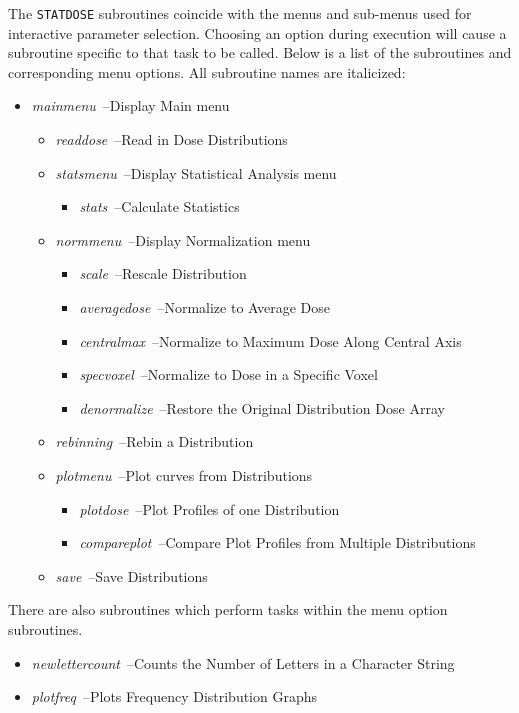 \documentclass[12pt,twoside]{article}
\begin{document}
The \verb+STATDOSE+ subroutines coincide with the menus and sub-menus used for interactive parameter selection. Choosing an option during execution will cause a subroutine specific to that task to be called. Below is a list of the subroutines and corresponding menu options.
All subroutine names are italicized:
\begin{itemize}
\item {\em mainmenu}\ --Display Main menu
\begin{itemize}
\item {\em readdose}\ --Read in Dose Distributions
\item {\em statsmenu}\ --Display Statistical Analysis menu
\begin{itemize}
\item {\em stats}\ --Calculate Statistics
\end{itemize}
\item {\em normmenu}\ --Display Normalization menu
\begin{itemize}
\item {\em scale}\ --Rescale Distribution
\item {\em averagedose}\ --Normalize to Average Dose
\item {\em centralmax}\ --Normalize to Maximum Dose Along Central Axis
\item {\em specvoxel}\ --Normalize to Dose in a Specific Voxel
\item {\em denormalize}\ --Restore the Original Distribution Dose Array
\end{itemize}
\item {\em rebinning}\ --Rebin a Distribution
\item {\em plotmenu}\ --Plot curves from Distributions
\begin{itemize}
\item {\em plotdose}\ --Plot Profiles of one Distribution
\item {\em compareplot}\ --Compare Plot Profiles from Multiple Distributions
\end{itemize}
\item {\em save}\ --Save Distributions
\end{itemize}
\end{itemize}

There are also subroutines which perform tasks within the menu option subroutines.
\begin{itemize}
 \item {\em newlettercount}\ --Counts the Number of Letters in a Character String
\item {\em plotfreq}\ --Plots Frequency Distribution Graphs
\end{itemize}
\end{document}
